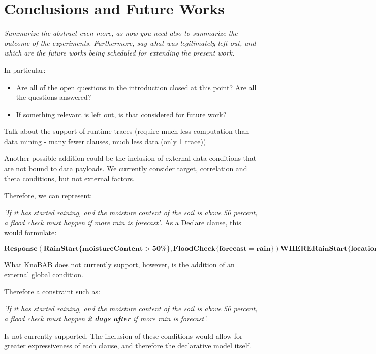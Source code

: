 \section{Conclusions and Future Works}
\textit{Summarize the abstract even more, as now you need also to summarize the outcome of the experiments. Furthermore, say what was legitimately left out, and which are the future works being scheduled for extending the present work.}

In particular:
\begin{itemize}
	\item Are all of the open questions in the introduction closed at this point? Are all the questions answered? 
	\item If something relevant is left out, is that considered for future work?
\end{itemize}

Talk about the support of runtime traces (require much less computation than data mining - many fewer clauses, much less data (only 1 trace))

Another possible addition could be the inclusion of external data conditions that are not bound to data payloads. We currently consider target, correlation and theta conditions, but not external factors. 

Therefore, we can represent: 

\emph{`If it has started raining, and the moisture content of the soil is above 50 percent, a flood check must happen if more rain is forecast'}.  
As a Declare clause, this would formulate:

{\tiny$\mathbf{Response(RainStart \{moistureContent>50\%\}, FloodCheck\{forecast=rain\}) WHERE RainStart\{location\} = FloodCheck\{location\}}$}

What KnoBAB does not currently support, however, is the addition of an external global condition. 

Therefore a constraint such as:

\emph{`If it has started raining, and the moisture content of the soil is above 50 percent, a flood check must happen \textbf{2 days after} if more rain is forecast'}.  

Is not currently supported. The inclusion of these conditions would allow for greater expressiveness of each clause, and therefore the declarative model itself.